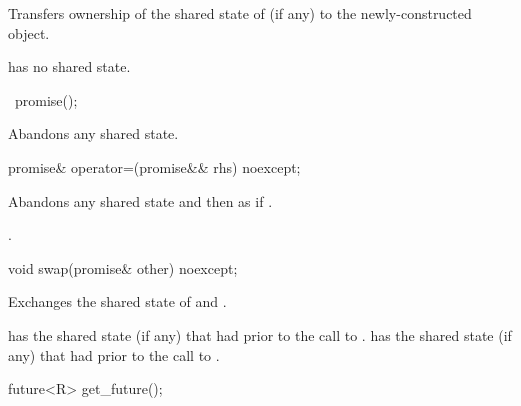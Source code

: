 \begin{itemdescr}
\pnum
\effects
Transfers ownership of the shared state
of  (if any) to the newly-constructed object.

\pnum
\ensures
{} has no shared state.
\end{itemdescr}

%
\begin{itemdecl}
~promise();
\end{itemdecl}

\begin{itemdescr}
\pnum
\effects
Abandons any shared state.
\end{itemdescr}

%
\begin{itemdecl}
promise& operator=(promise&& rhs) noexcept;
\end{itemdecl}

\begin{itemdescr}
\pnum
\effects
Abandons any shared state and then as if
.

\pnum
\returns
{}.
\end{itemdescr}

%
\begin{itemdecl}
void swap(promise& other) noexcept;
\end{itemdecl}

\begin{itemdescr}
\pnum
\effects
Exchanges the shared state of  and .

\pnum
\ensures
{} has the shared state (if any) that  had
prior to the call to .  has the shared state (if any) that
 had prior to the call to .
\end{itemdescr}

%
\begin{itemdecl}
future<R> get_future();
\end{itemdecl}

